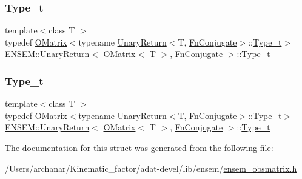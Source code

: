 \subsubsection{\texorpdfstring{Type\_t}{Type\_t}\hspace{0.1cm}{\footnotesize\ttfamily [2/3]}}
{\footnotesize\ttfamily template$<$class T $>$ \\
typedef \mbox{\hyperlink{classENSEM_1_1OMatrix}{O\+Matrix}}$<$typename \mbox{\hyperlink{structENSEM_1_1UnaryReturn}{Unary\+Return}}$<$T, \mbox{\hyperlink{structENSEM_1_1FnConjugate}{Fn\+Conjugate}}$>$\+::\mbox{\hyperlink{structENSEM_1_1UnaryReturn_3_01OMatrix_3_01T_01_4_00_01FnConjugate_01_4_ac5de4bf0142b30100d4ade43fc2817d8}{Type\+\_\+t}}$>$ \mbox{\hyperlink{structENSEM_1_1UnaryReturn}{E\+N\+S\+E\+M\+::\+Unary\+Return}}$<$ \mbox{\hyperlink{classENSEM_1_1OMatrix}{O\+Matrix}}$<$ T $>$, \mbox{\hyperlink{structENSEM_1_1FnConjugate}{Fn\+Conjugate}} $>$\+::\mbox{\hyperlink{structENSEM_1_1UnaryReturn_3_01OMatrix_3_01T_01_4_00_01FnConjugate_01_4_ac5de4bf0142b30100d4ade43fc2817d8}{Type\+\_\+t}}}

\mbox{\label{structENSEM_1_1UnaryReturn_3_01OMatrix_3_01T_01_4_00_01FnConjugate_01_4_ac5de4bf0142b30100d4ade43fc2817d8}} 
\subsubsection{\texorpdfstring{Type\_t}{Type\_t}\hspace{0.1cm}{\footnotesize\ttfamily [3/3]}}
{\footnotesize\ttfamily template$<$class T $>$ \\
typedef \mbox{\hyperlink{classENSEM_1_1OMatrix}{O\+Matrix}}$<$typename \mbox{\hyperlink{structENSEM_1_1UnaryReturn}{Unary\+Return}}$<$T, \mbox{\hyperlink{structENSEM_1_1FnConjugate}{Fn\+Conjugate}}$>$\+::\mbox{\hyperlink{structENSEM_1_1UnaryReturn_3_01OMatrix_3_01T_01_4_00_01FnConjugate_01_4_ac5de4bf0142b30100d4ade43fc2817d8}{Type\+\_\+t}}$>$ \mbox{\hyperlink{structENSEM_1_1UnaryReturn}{E\+N\+S\+E\+M\+::\+Unary\+Return}}$<$ \mbox{\hyperlink{classENSEM_1_1OMatrix}{O\+Matrix}}$<$ T $>$, \mbox{\hyperlink{structENSEM_1_1FnConjugate}{Fn\+Conjugate}} $>$\+::\mbox{\hyperlink{structENSEM_1_1UnaryReturn_3_01OMatrix_3_01T_01_4_00_01FnConjugate_01_4_ac5de4bf0142b30100d4ade43fc2817d8}{Type\+\_\+t}}}



The documentation for this struct was generated from the following file\+:\begin{DoxyCompactItemize}
\item 
/\+Users/archanar/\+Kinematic\+\_\+factor/adat-\/devel/lib/ensem/\mbox{\hyperlink{adat-devel_2lib_2ensem_2ensem__obsmatrix_8h}{ensem\+\_\+obsmatrix.\+h}}\end{DoxyCompactItemize}
